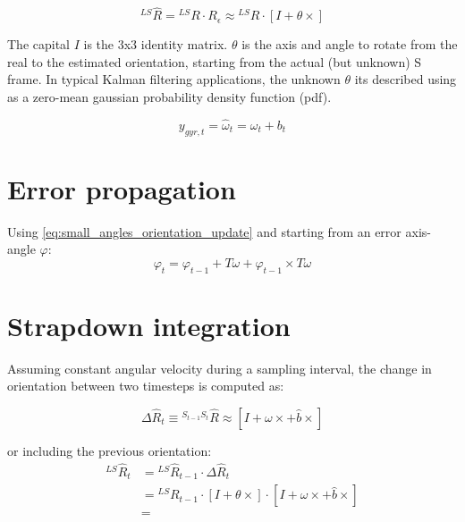 \documentclass{article}
\begin{document}
\begin{equation} \label{eq:orientation_error_definition}
{}^{LS} \hat{R} = {}^{LS} R \cdot R_{\epsilon} \approx {}^{LS} R \cdot \left[ I + \theta\times  \right]
\end{equation}

The capital $I$ is the 3x3 identity matrix. $\theta$ is the axis and angle to rotate from the real to the estimated orientation, starting from the actual (but unknown) S frame. In typical Kalman filtering applications, the unknown $\theta$ its described using as a zero-mean gaussian probability density function (pdf).

\begin{equation} \label{eq:angular_velocity_model}
y_{gyr,t} =  \hat{\omega}_t = \omega_t + b_t
\end{equation}

\section{Error propagation}
Using \ref{eq:small_angles_orientation_update} and starting from an error axis-angle $\varphi$:
\begin{equation} \label{eq:phi_propagation}
\varphi_t =  \varphi_{t-1} + T\omega + \varphi_{t-1} \times T\omega 
\end{equation}

\section{Strapdown integration}
Assuming constant angular velocity during a sampling interval, the change in orientation between two timesteps is computed as:

\begin{equation} \label{eq:strapdown_orientation_including_bias}
\Delta \hat{R}_t \equiv {}^{S_{t-1}S_t} \hat{R} \approx \left[ I + \omega \times   +  \hat{b}\times  \right]
\end{equation}

or including the previous orientation:
\begin{equation} \label{eq:strapdown_orientation_propagation_rotation_matrix}
\begin{aligned}
{}^{LS} \hat{R}_t &= {}^{LS} \hat{R}_{t-1} \cdot  \Delta \hat{R}_t  \\
&= {}^{LS} R_{t-1} \cdot \left[ I + \theta\times  \right] \cdot \left[ I + \omega \times   +  \hat{b}\times  \right] \\
&=
\end{aligned}
\end{equation}


\printbibliography
\end{document}
